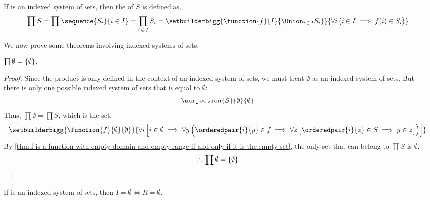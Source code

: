 \begin{dfn}[Product]
    \label{dfn:product-of-indexed-system-of-sets}
    If  is an indexed system of sets, then the  of \( S \) is defined as,
    \begin{equation*}
        \prod S =
        \prod \sequence{S_{i}}{i \in I} =
        \prod_{i \,\in\, I} S_{i} = \setbuilderbigg{\function{f}{I}{\Union_{i \,\in\, I} S_{i}}}{\forall i \, \big( i \in I \implies f(i) \in S_{i} \big)}
    \end{equation*}
\end{dfn}

\vspace{0.1cm}
\noindent
We now prove some theorems involving indexed systems of sets.

\begin{thm}
    \label{thm:product-of-an-empty-set}
    \( \prod \emptyset = \mleft\{ \emptyset \mright\} \).
\end{thm}

\begin{proof}
    Since the product is only defined in the context of an indexed system of sets, we must treat \( \emptyset \)
    as an indexed system of sets. But there is only one possible indexed system of sets that is equal to \( \emptyset \):
    \begin{equation*}
        \surjection{S}{\emptyset}{\emptyset}
    \end{equation*}
    Thus, \( \prod \emptyset = \prod S \), which is the set,
    \begin{equation*}
        \setbuilderbigg{\function{f}{\emptyset}{\emptyset}}{\forall i \, \Big[ i \in \emptyset \implies
        \forall y \, \Big( \orderedpair{i}{y} \in f \implies \forall z \, \big[ \orderedpair{i}{z} \in S \implies y \in z \big] \Big)\Big]}
    \end{equation*}
    By \cref{thm:f-is-a-function-with-empty-domain-and-empty-range-if-and-only-if-it-is-the-empty-set}, the only set that can belong to
    \( \prod S \) is \( \emptyset \).
    \begin{equation*}
        \therefore \, \prod \emptyset = \mleft\{ \emptyset \mright\} \qedhere
    \end{equation*}
\end{proof}

\begin{thm}
    \label{thm:any-indexed-system-of-sets-with-empty-domain-must-have-empty-range-and-vice-versa}
    If  is an indexed system of sets, then \( I = \emptyset \iff R = \emptyset \).
\end{thm}


